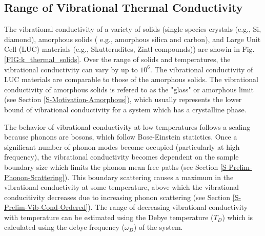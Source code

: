 \documentclass[letterpaper,12pt]{article}
\begin{document}
\subsection{\label{S-Back-Lattice-Cond-Range}Range of Vibrational Thermal Conductivity}


The vibrational conductivity of a variety of solids (single species crystals (e.g., Si, diamond), amorphous solids ( e.g., amorphous silica and carbon), and Large Unit Cell (LUC) materials (e.g., Skutterudites, Zintl compounds)) are showin in Fig. \ref{FIG:k_thermal_solids}. Over the range of solids and temperatures, the vibrational conductivity can vary by up to $10^6$. The vibrational conductivity of LUC materials are comparable to those of the amorphous solids.  The vibrational conductivity of amorphous solids is refered to as the "glass" or amorphous limit (see Section \ref{S-Motivation-Amorphous}), which usually represents the lower bound of vibrational conductivity for a system which has a crystalline phase.\cite{cahill1987,cahill1992}

The behavior of vibrational conductivity at low temperatures follows a scaling because phonons are bosons, which follow Bose-Einstein statictics.\cite{srivastava1990,stephens1971,freeman1986} Once a significant number of phonon modes become occupied (particularly at high frequency), the vibrational conductivity becomes dependent on the sample boundary size which limits the phonon mean free paths (see Section \ref{S-Prelim-Phonon-Scattering}). This boundary scattering causes a maximum in the vibrational conductivity at some temperature, above which the vibrational conducitivity decreases due to increasing phonon scattering (see Section \ref{S-Prelim-Vib-Cond-Ordered}). The range of decreasing vibrational conductivity with temperature can be estimated using the Debye temperature ($T_D$) which is calculated using the debye frequency ($\omega_D$) of the system.\cite{ashcroft1976,srivastava1990}
\end{document}
